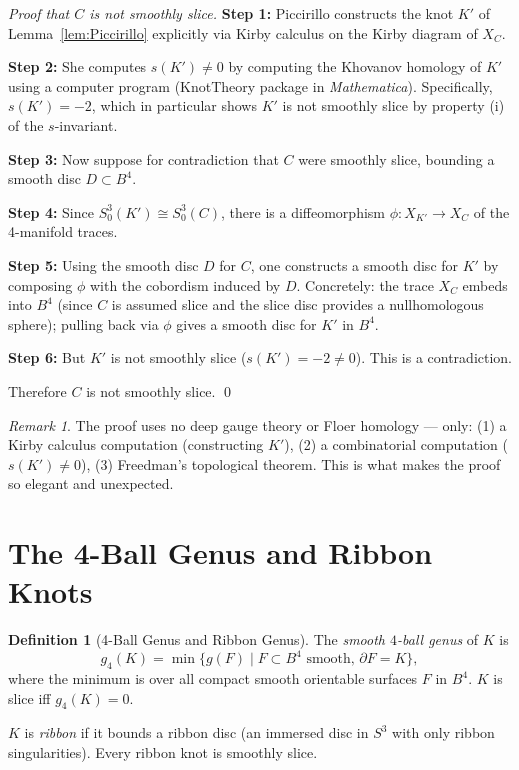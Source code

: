 \documentclass[12pt,a4paper]{amsart}
\theoremstyle{definition}
\newtheorem{definition}[theorem]{Definition}
\theoremstyle{remark}
\newtheorem{remark}[theorem]{Remark}
\begin{document}
\begin{proof}[Proof that $C$ is not smoothly slice]
\textbf{Step 1:} Piccirillo constructs the knot $K'$ of Lemma~\ref{lem:Piccirillo}
explicitly via Kirby calculus on the Kirby diagram of $X_C$.

\textbf{Step 2:} She computes $s(K') \neq 0$ by computing the Khovanov
homology of $K'$ using a computer program (KnotTheory package in
\textit{Mathematica}). Specifically, $s(K') = -2$, which in particular shows
$K'$ is not smoothly slice by property (i) of the $s$-invariant.

\textbf{Step 3:} Now suppose for contradiction that $C$ were smoothly slice,
bounding a smooth disc $D \subset B^4$.

\textbf{Step 4:} Since $S^3_0(K') \cong S^3_0(C)$, there is a diffeomorphism
$\phi \colon X_{K'} \to X_C$ of the 4-manifold traces.

\textbf{Step 5:} Using the smooth disc $D$ for $C$, one constructs a smooth
disc for $K'$ by composing $\phi$ with the cobordism induced by $D$.
Concretely: the trace $X_C$ embeds into $B^4$ (since $C$ is assumed slice
and the slice disc provides a nullhomologous sphere); pulling back via
$\phi$ gives a smooth disc for $K'$ in $B^4$.

\textbf{Step 6:} But $K'$ is not smoothly slice ($s(K') = -2 \neq 0$).
This is a contradiction.

Therefore $C$ is not smoothly slice. \qed
\end{proof}

\begin{remark}
The proof uses no deep gauge theory or Floer homology — only:
(1) a Kirby calculus computation (constructing $K'$),
(2) a combinatorial computation ($s(K') \neq 0$),
(3) Freedman's topological theorem.
This is what makes the proof so elegant and unexpected.
\end{remark}

\section{The 4-Ball Genus and Ribbon Knots}

\begin{definition}[4-Ball Genus and Ribbon Genus]
The \emph{smooth $4$-ball genus} of $K$ is
\[
    g_4(K) = \min\{ g(F) \mid F \subset B^4 \text{ smooth, } \partial F = K \},
\]
where the minimum is over all compact smooth orientable surfaces $F$ in $B^4$.
$K$ is slice iff $g_4(K) = 0$.

$K$ is \emph{ribbon} if it bounds a ribbon disc (an immersed disc in $S^3$
with only ribbon singularities). Every ribbon knot is smoothly slice.
\end{definition}
\end{document}
